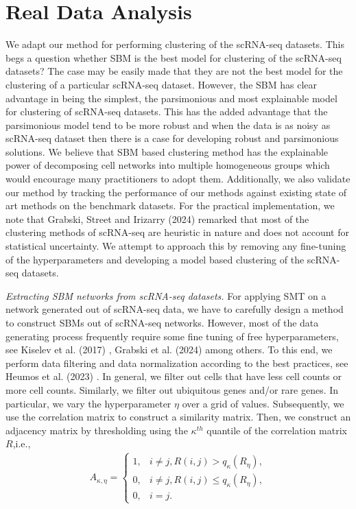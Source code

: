 \documentclass[11pt]{article}
\newcommand{\ba}{\begin{eqnarray*}}
\newcommand{\ea}{\end{eqnarray*}}
\begin{document}
\section{Real Data Analysis}\label{data}
We adapt our method for performing clustering of the scRNA-seq datasets. This begs a question whether SBM is the best model for clustering of the scRNA-seq datasets? The case may be easily made that they are not the best model for the clustering of a particular scRNA-seq dataset. However, the SBM has clear advantage in being the simplest, the parsimonious and most explainable model for clustering of scRNA-seq datasets.
This has the added advantage that the parsimonious model tend to be more robust and when the data is as noisy as scRNA-seq dataset then there is a case for developing robust and parsimonious solutions. We believe that SBM based clustering method has the explainable power of decomposing cell networks into multiple homogeneous groups which would encourage many practitioners to adopt them. Additionally, we also validate our method by tracking the performance of our methods against existing state of art methods on the benchmark datasets. 
For the practical implementation, we note that Grabski, Street and Irizarry (2024)\cite{irizarry2024} remarked that most of the clustering methods of scRNA-seq are heuristic in nature and does not account for statistical uncertainty. We attempt to approach this by removing any fine-tuning of the hyperparameters and developing a model based clustering of the scRNA-seq datasets.

\emph{Extracting SBM networks from scRNA-seq datasets.} For applying SMT on a network generated out of scRNA-seq data, we have to carefully design a method to construct SBMs out of scRNA-seq networks. However, most of the data generating process frequently require some fine tuning of free hyperparameters, see Kiselev et al. (2017) \cite{kiselev2017}, Grabski et al. (2024) \cite{irizarry2024} among others. To this end, we perform data filtering and data normalization according to the best practices, see Heumos et al. (2023) \cite{heumos2023}. In general, we filter out cells that have less cell counts or more cell counts. Similarly, we filter out ubiquitous genes and/or rare genes. In particular, we vary the hyperparameter $\eta$ over a grid of values. Subsequently, we use the correlation matrix to construct a similarity matrix. Then, we construct an adjacency matrix by thresholding using the $\kappa^{th}$ quantile of the correlation matrix $R$,i.e.,
\ba
A_{\kappa, \eta} = \begin{cases}
1, & i \neq j, R(i,j) > q_{\kappa}(R_{\eta}), \\
0, & i \neq j, R(i,j) \le q_{\kappa}(R_{\eta}), \\
0, & i = j.
\end{cases}
\ea
\end{document}
